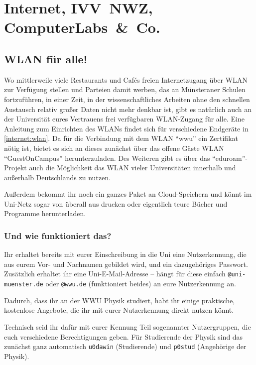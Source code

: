 \section{Internet, IVV~NWZ, Computer\-Labs~\&~Co.}
\begin{multicols}{2}
\subsection{WLAN für alle!}
Wo mittlerweile viele Restaurants und Cafés freien Internetzugang über WLAN zur Verfügung stellen und Parteien damit werben, das an Münsteraner Schulen fortzuführen, in einer Zeit, in der wissenschaftliches Arbeiten ohne den schnellen Austausch relativ großer Daten nicht mehr denkbar ist, gibt es natürlich auch an der Universität eures Vertrauens frei verfügbaren WLAN-Zugang für alle.
Eine Anleitung zum Einrichten des WLANs findet sich für verschiedene Endgeräte in \cref{internet:wlan}.
Da für die Verbindung mit dem WLAN \enquote{wwu} ein Zertifikat nötig ist, bietet es sich an dieses zunächst über das offene Gäste WLAN \enquote{GuestOnCampus} herunterzuladen.
Des Weiteren gibt es über das \enquote{eduroam}-Projekt auch die Möglichkeit das WLAN vieler Universitäten innerhalb und außerhalb Deutschlands zu nutzen.

Außerdem bekommt ihr noch ein ganzes Paket an Cloud-Speichern und könnt im Uni-Netz sogar von überall aus drucken oder eigentlich teure Bücher und Programme herunterladen.

\subsubsection{Und wie funktioniert das?}
Ihr erhaltet bereits mit eurer Einschreibung in die Uni eine Nutzerkennung, die aus eurem Vor- und Nachnamen gebildet wird, und ein dazugehöriges Passwort.
Zusätzlich erhaltet ihr eine Uni-E-Mail-Adresse -- hängt für diese einfach \texttt{@uni-muenster.de} oder \texttt{@wwu.de} (funktioniert beides) an eure Nutzerkennung an.

Dadurch, dass ihr an der WWU Physik studiert, habt ihr einige praktische, kostenlose Angebote, die ihr mit eurer Nutzerkennung direkt nutzen könnt.

Technisch seid ihr dafür mit eurer Kennung Teil sogenannter Nutzergruppen, die euch verschiedene Berechtigungen geben. Für Studierende der Physik sind das zunächst ganz automatisch \texttt{u0dawin} (Studierende) und \texttt{p0stud} (Angehörige der Physik).


\end{multicols}
